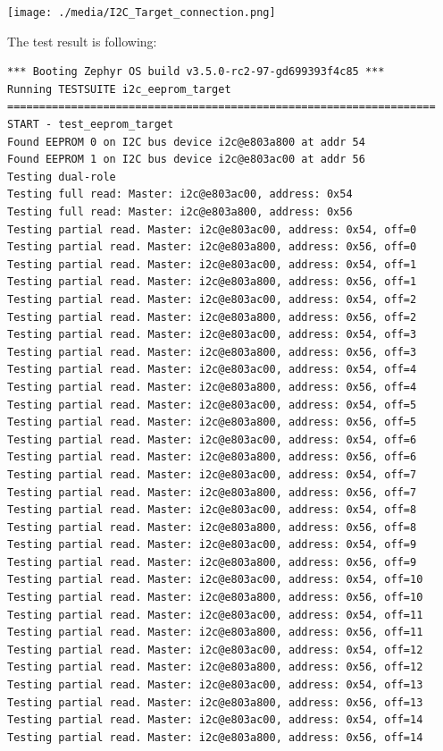 \documentclass[11pt,a4paper,oneside]{article}
\begin{document}
\texttt{[image: ./media/I2C\_Target\_connection.png]}

The test result is following:

\begin{lstlisting}
*** Booting Zephyr OS build v3.5.0-rc2-97-gd699393f4c85 ***
Running TESTSUITE i2c_eeprom_target
===================================================================
START - test_eeprom_target
Found EEPROM 0 on I2C bus device i2c@e803a800 at addr 54
Found EEPROM 1 on I2C bus device i2c@e803ac00 at addr 56
Testing dual-role
Testing full read: Master: i2c@e803ac00, address: 0x54
Testing full read: Master: i2c@e803a800, address: 0x56
Testing partial read. Master: i2c@e803ac00, address: 0x54, off=0
Testing partial read. Master: i2c@e803a800, address: 0x56, off=0
Testing partial read. Master: i2c@e803ac00, address: 0x54, off=1
Testing partial read. Master: i2c@e803a800, address: 0x56, off=1
Testing partial read. Master: i2c@e803ac00, address: 0x54, off=2
Testing partial read. Master: i2c@e803a800, address: 0x56, off=2
Testing partial read. Master: i2c@e803ac00, address: 0x54, off=3
Testing partial read. Master: i2c@e803a800, address: 0x56, off=3
Testing partial read. Master: i2c@e803ac00, address: 0x54, off=4
Testing partial read. Master: i2c@e803a800, address: 0x56, off=4
Testing partial read. Master: i2c@e803ac00, address: 0x54, off=5
Testing partial read. Master: i2c@e803a800, address: 0x56, off=5
Testing partial read. Master: i2c@e803ac00, address: 0x54, off=6
Testing partial read. Master: i2c@e803a800, address: 0x56, off=6
Testing partial read. Master: i2c@e803ac00, address: 0x54, off=7
Testing partial read. Master: i2c@e803a800, address: 0x56, off=7
Testing partial read. Master: i2c@e803ac00, address: 0x54, off=8
Testing partial read. Master: i2c@e803a800, address: 0x56, off=8
Testing partial read. Master: i2c@e803ac00, address: 0x54, off=9
Testing partial read. Master: i2c@e803a800, address: 0x56, off=9
Testing partial read. Master: i2c@e803ac00, address: 0x54, off=10
Testing partial read. Master: i2c@e803a800, address: 0x56, off=10
Testing partial read. Master: i2c@e803ac00, address: 0x54, off=11
Testing partial read. Master: i2c@e803a800, address: 0x56, off=11
Testing partial read. Master: i2c@e803ac00, address: 0x54, off=12
Testing partial read. Master: i2c@e803a800, address: 0x56, off=12
Testing partial read. Master: i2c@e803ac00, address: 0x54, off=13
Testing partial read. Master: i2c@e803a800, address: 0x56, off=13
Testing partial read. Master: i2c@e803ac00, address: 0x54, off=14
Testing partial read. Master: i2c@e803a800, address: 0x56, off=14

\end{lstlisting}
\end{document}
